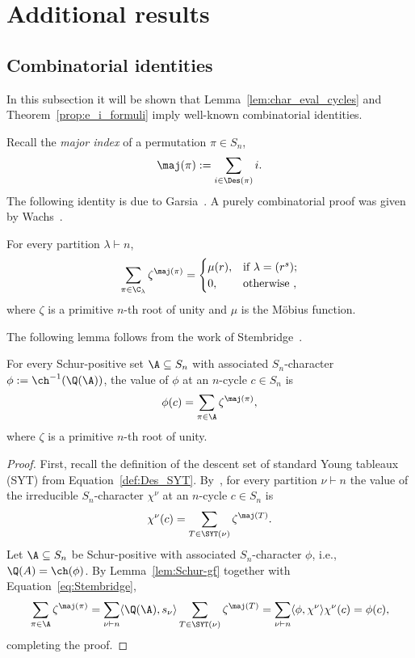 \section{Additional results}
\label{sec:final}

\subsection{Combinatorial identities}
\label{remarks_on_s=1}

In this subsection it will be shown that Lemma~\ref{lem:char_eval_cycles} and Theorem~\ref{prop:e_i_formuli} imply well-known combinatorial identities.

Recall the {\em major index} of a permutation $\pi \in S_n$,
\[
    \maj(\pi):=\sum\limits_{i\in \Des(\pi)}i.
\]
The following identity is due to 
Garsia~\cite{Garsia}. A purely combinatorial proof was given by Wachs~\cite{Wachs}.

\begin{proposition}\label{prop:Garsia}
     For every partition $\lambda\vdash n$,
    \[
        \sum_{\pi \in \C_\lambda} \zeta^{\maj(\pi)}
        = \begin{cases} 
            \mu(r), &\text{if } \lambda = (r^s); \\
    		0, &\text{otherwise },
		\end{cases}
    \]
    where $\zeta$ is a primitive $n$-th root of unity and $\mu$ is the M\"obius function. 
\end{proposition}

The following lemma follows from the work of Stembridge~\cite{Stembridge}.

\begin{lemma}\label{prop:equiv_Garsia}
    For every Schur-positive set $\A\subseteq S_n$ with associated $S_n$-character $\phi := \ch^{-1}(\Q(\A))$, the value of $\phi$ at an $n$-cycle $c\in S_n$ is
    \[
        \phi(c) = \sum_{\pi \in \A} \zeta^{\maj(\pi)},
    \]
    where $\zeta$ is a primitive $n$-th root of unity. 
\end{lemma}

\begin{proof}
    First, recall 
    the definition of the descent set of standard Young tableaux (SYT) 
    from Equation~\eqref{def:Des_SYT}. By~\cite[Lemma 3.4]{Stembridge}, for every partition $\nu\vdash n$ the value of the irreducible $S_n$-character $\chi^\nu$ at an $n$-cycle $c\in S_n$ is 
    \begin{equation}\label{eq:Stembridge}
        \chi^\nu(c)=\sum\limits_{T\in \SYT(\nu)}\zeta^{\maj(T)}.
    \end{equation}
    Let $\A\subseteq S_n$ be Schur-positive with associated $S_n$-character $\phi$, i.e., 
    $\Q(A)=\ch (\phi)$. 
    By Lemma~\ref{lem:Schur-gf} 
    together with Equation~\eqref{eq:Stembridge},
    \[
        \sum_{\pi \in \A} \zeta^{\maj(\pi)}
        = \sum_{\nu \vdash n} \langle \Q(\A), s_\nu \rangle \sum_{T \in \SYT(\nu)} \zeta^{\maj(T)}
        = \sum_{\nu \vdash n} \langle \phi, \chi^\nu \rangle \chi^\nu(c)
        = \phi(c), 
    \]
    completing the proof.
\end{proof}

